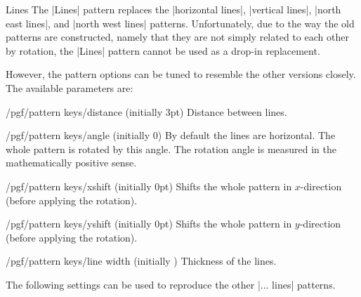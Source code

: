 \begin{pattern}{Lines}
    The |Lines| pattern replaces the |horizontal lines|, |vertical lines|,
    |north east lines|, and |north west lines| patterns. Unfortunately, due to
    the way the old patterns are constructed, namely that they are not simply
    related to each other by rotation, the |Lines| pattern cannot be used as a
    drop-in replacement.

    However, the pattern options can be tuned to resemble the other versions
    closely. The available parameters are:
    \begin{key}{/pgf/pattern keys/distance (initially 3pt)}
        Distance between lines.
    \end{key}
    \begin{key}{/pgf/pattern keys/angle (initially 0)}
        By default the lines are horizontal. The whole pattern is rotated by
        this angle. The rotation angle is measured in the mathematically
        positive sense.
    \end{key}
    \begin{key}{/pgf/pattern keys/xshift (initially 0pt)}
        Shifts the whole pattern in $x$-direction (before applying the
        rotation).
    \end{key}
    \begin{key}{/pgf/pattern keys/yshift (initially 0pt)}
        Shifts the whole pattern in $y$-direction (before applying the
        rotation).
    \end{key}
    \begin{key}{/pgf/pattern keys/line width (initially \string\the\string\pgflinewidth)}
        Thickness of the lines.
    \end{key}
    The following settings can be used to reproduce the other |... lines|
    patterns.
\begin{codeexample}[preamble={\usetikzlibrary{patterns,patterns.meta}}]
\end{codeexample}
\end{pattern}

